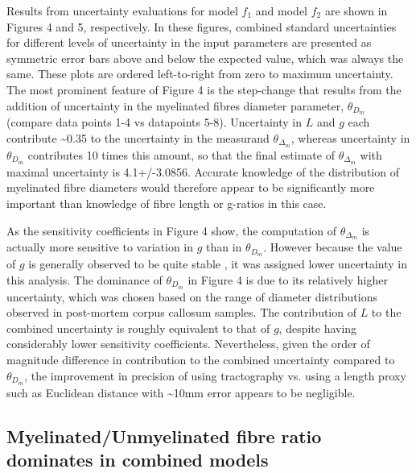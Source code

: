 
Results from uncertainty evaluations for model $f_1$ and model $f_2$ are shown in Figures 4 and 5, respectively. In these figures, combined standard uncertainties for different levels of uncertainty in the input parameters are presented as symmetric error bars above and below the expected value, which was always the same. These plots are ordered left-to-right from zero to maximum uncertainty. The most prominent feature of Figure 4 is the step-change that results from the addition of uncertainty in the myelinated fibres diameter
parameter, $\theta_{D_m}$ (compare data points 1-4 vs datapoints 5-8). Uncertainty in $L$ and $g$ each contribute \textasciitilde{}0.35 to the uncertainty in the measurand $\theta_{\Delta_m}$, whereas uncertainty in $\theta_{D_m}$ contributes 10 times this amount, so that the final estimate of $\theta_{\Delta_m}$ with maximal uncertainty is 4.1+/-3.0856. Accurate knowledge of the distribution of myelinated fibre diameters would therefore appear to be significantly more important than knowledge of fibre length or g-ratios in this case.

As the sensitivity coefficients in Figure 4 show, the computation of $\theta_{\Delta_m}$ is actually more sensitive to variation in $g$ than in $\theta_{D_m}$. However because the value of $g$ is generally observed to be quite stable , it was assigned lower uncertainty in this analysis. The dominance of $\theta_{D_m}$ in Figure 4 is due to its relatively higher uncertainty, which was chosen based on the range of diameter distributions observed in post-mortem corpus callosum samples. The contribution of $L$ to the combined uncertainty is roughly equivalent to that of $g$, despite having considerably lower sensitivity coefficients. Nevertheless, given the order of magnitude difference in contribution to the combined uncertainty compared to $\theta_{D_m}$, the improvement in precision of using tractography vs. using a length proxy such as Euclidean distance with \textasciitilde{}10mm error appears to be negligible.

\subsection{Myelinated/Unmyelinated fibre ratio dominates in combined models}


